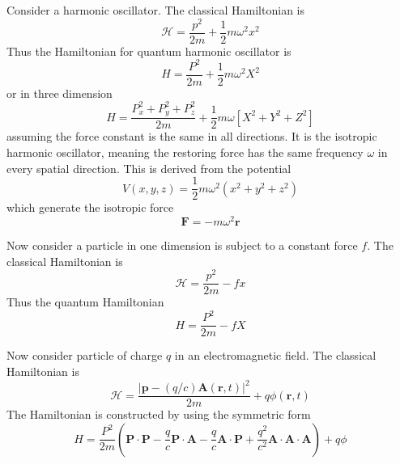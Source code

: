 \documentclass[../../../main.tex]{subfiles}
\begin{document}
Consider a harmonic oscillator.
The classical Hamiltonian is 
\begin{equation*}
    \mathcal{H }=\frac{p^2 }{2m }+\frac{1 }{2 }m\omega^2x^2
\end{equation*}
Thus the Hamiltonian for quantum harmonic oscillator is 
\begin{equation*}
    H=\frac{P^2 }{2m }+\frac{1 }{2 }m\omega^2X^2
\end{equation*}
or in three dimension
\begin{equation*}
    H=\frac{P_x^2+P_y^2+P_z^2}{2m  }+\frac{1 }{2}m\omega \left[ X^2+Y^2+Z^2 \right] 
\end{equation*}
assuming the force constant is the same in all directions.
It is the isotropic harmonic oscillator, meaning the restoring force has the same frequency $\omega$ in every spatial direction.
This is derived from the potential
\begin{equation*}
    V(x,y,z) = \frac{1}{2} m \omega^2 (x^2 + y^2 + z^2)
\end{equation*}
which generate the isotropic force 
\begin{equation*}
    \mathbf{F }= -m \omega^2 \mathbf{r}
\end{equation*}

Now consider a particle in one dimension is subject to a constant force $f$.
The classical Hamiltonian is 
\begin{equation*}
    \mathcal{H }=\frac{p^2 }{2m }-fx
\end{equation*}
Thus the quantum Hamiltonian  
\begin{equation*}
    H=\frac{P^2 }{2m }-fX
\end{equation*}

Now consider particle of charge $q$ in an electromagnetic field.
The classical Hamiltonian is 
\begin{equation*}
    \mathcal{H }=\frac{|\mathbf{p }-(q/c) \mathbf{A}(\mathbf{r},t)|^2 }{2m }+q\phi(\mathbf{r },t)
\end{equation*}
The Hamiltonian is constructed by using the symmetric form 
\begin{equation*}
    H=\frac{P^2 }{2m }\left( \mathbf{P }\cdot \mathbf{P }-\frac{q }{c }\mathbf{P }\cdot \mathbf{A}-\frac{q }{c}\mathbf{A}\cdot \mathbf{P}+\frac{q^2 }{c^2}\mathbf{A }\cdot \mathbf{A}\cdot \mathbf{A} \right) +q\phi
\end{equation*}
\end{document}
